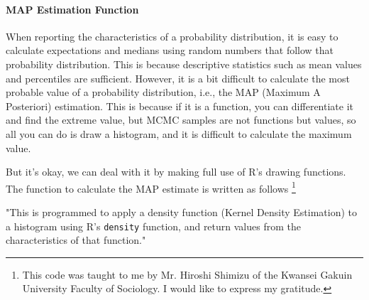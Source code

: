 \documentclass{ltjsbook}
\begin{document}
\paragraph{MAP Estimation Function}
When reporting the characteristics of a probability distribution, it is easy to calculate expectations and medians using random numbers that follow that probability distribution. This is because descriptive statistics such as mean values and percentiles are sufficient. However, it is a bit difficult to calculate the most probable value of a probability distribution, i.e., the MAP (Maximum A Posteriori) estimation. This is because if it is a function, you can differentiate it and find the extreme value, but MCMC samples are not functions but values, so all you can do is draw a histogram, and it is difficult to calculate the maximum value.

But it's okay, we can deal with it by making full use of R's drawing functions. The function to calculate the MAP estimate is written as follows \footnote{This code was taught to me by Mr. Hiroshi Shimizu of the Kwansei Gakuin University Faculty of Sociology. I would like to express my gratitude.}


"This is programmed to apply a density function (Kernel Density Estimation) to a histogram using R's \verb|density| function, and return values from the characteristics of that function."

\end{document}
